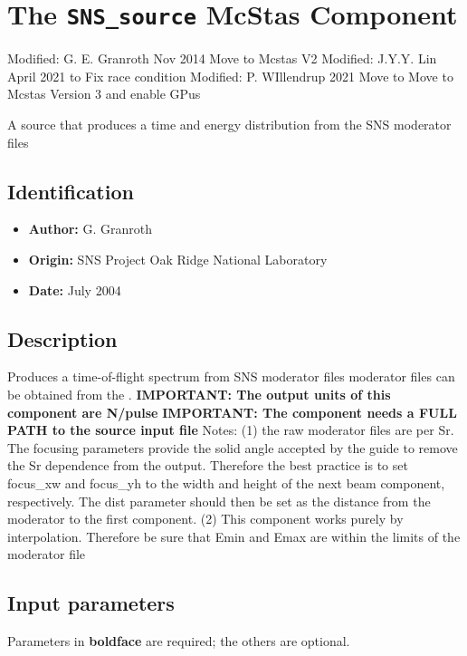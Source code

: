 \section{The \texttt{SNS\_source} McStas Component}
Modified: G. E. Granroth  Nov 2014 Move to Mcstas V2
Modified: J.Y.Y. Lin April 2021 to Fix race condition
Modified: P. WIllendrup 2021 Move to Move to Mcstas Version 3 and enable GPus

A source that produces a time and energy distribution from the SNS moderator files

\subsection*{Identification}
\begin{itemize}
  \item \textbf{Author:} G. Granroth
  \item \textbf{Origin:} SNS Project Oak Ridge National Laboratory
  \item \textbf{Date:} July 2004
\end{itemize}

\subsection*{Description}
Produces a time-of-flight spectrum from SNS moderator files moderator files can be obtained from the . \textbf{IMPORTANT: The output units of this component are N/pulse} \textbf{IMPORTANT: The component needs a FULL PATH to the source input file} Notes: (1) the raw moderator files are per Sr. The focusing parameters provide the solid angle accepted by the guide to remove the Sr dependence from the output. Therefore the best practice is to set focus\_xw and focus\_yh to the width and height of the next beam component, respectively. The dist parameter should then be set as the distance from the moderator to the first component. (2) This component works purely by interpolation. Therefore be sure that Emin and Emax are within the limits of the moderator file

\subsection*{Input parameters}
Parameters in \textbf{boldface} are required; the others are optional.

